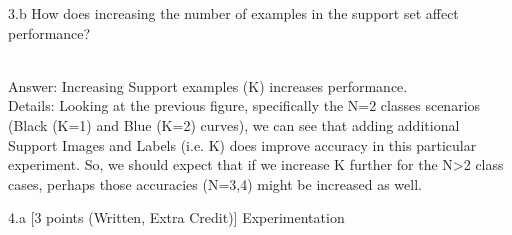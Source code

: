 \clearpage

\LARGE
3.b How does increasing the number of examples in the support set affect performance?
\normalsize

\begin{answer}

\large

\\
Answer: Increasing Support examples (K) increases performance.
\normalsize
\\

Details: Looking at the previous figure, specifically the N=2 classes scenarios (Black (K=1) and Blue (K=2) curves), we can see that adding additional Support Images and Labels (i.e. K) does improve accuracy in this particular experiment. So, we should expect that if we increase K further for the N>2 class cases, perhaps those accuracies (N=3,4) might be increased as well.

    
\end{answer}

\clearpage

\LARGE
4.a [3 points (Written, Extra Credit)] Experimentation
\normalsize

